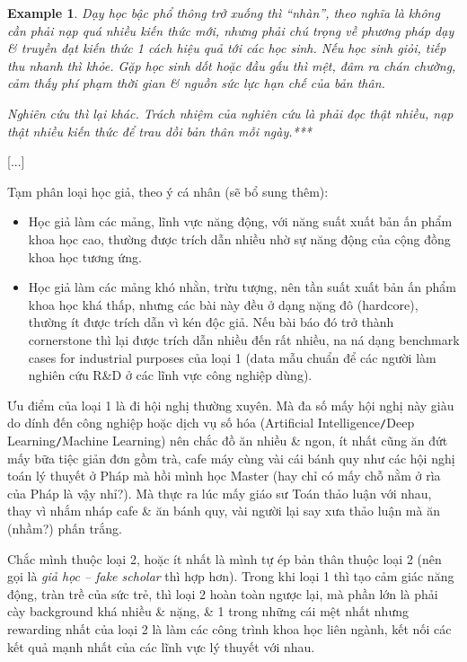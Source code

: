 \documentclass[12pt]{article}
\newtheorem{example}{Example}
\begin{document}
\begin{example}
	Dạy học bậc phổ thông trở xuống thì ``nhàn'', theo nghĩa là không cần phải nạp quá nhiều kiến thức mới, nhưng phải chú trọng về phương pháp dạy \& truyền đạt kiến thức 1 cách hiệu quả tới các học sinh. Nếu học sinh giỏi, tiếp thu nhanh thì khỏe. Gặp học sinh dốt hoặc đầu gấu thì mệt, đâm ra chán chường, cảm thấy phí phạm thời gian \& nguồn sức lực hạn chế của bản thân.
	
	Nghiên cứu thì lại khác. Trách nhiệm của nghiên cứu là phải đọc thật nhiều, nạp thật nhiều kiến thức để trau dồi bản thân mỗi ngày.***
\end{example}
[...]

Tạm phân loại học giả, theo ý cá nhân (sẽ bổ sung thêm):
\begin{itemize}
	\item Học giả làm các mảng, lĩnh vực năng động, với năng suất xuất bản ấn phẩm khoa học cao, thường được trích dẫn nhiều nhờ sự năng động của cộng đồng khoa học tương ứng.
	\item Học giả làm các mảng khó nhằn, trừu tượng, nên tần suất xuất bản ấn phẩm khoa học khá thấp, nhưng các bài này đều ở dạng nặng đô (hardcore), thường ít được trích dẫn vì kén độc giả. Nếu bài báo đó trở thành cornerstone thì lại được trích dẫn nhiều đến rất nhiều, na ná dạng benchmark cases for industrial purposes của loại 1 (data mẫu chuẩn để các người làm nghiên cứu R\&D ở các lĩnh vực công nghiệp dùng).
\end{itemize}
Ưu điểm của loại 1 là đi hội nghị thường xuyên. Mà đa số mấy hội nghị này giàu do dính đến công nghiệp hoặc dịch vụ số hóa (Artificial Intelligence{\tt/}Deep Learning{\tt/}Machine Learning) nên chắc đồ ăn nhiều \& ngon, ít nhất cũng ăn đứt mấy bữa tiệc giản đơn gồm trà, cafe máy cùng vài cái bánh quy như các hội nghị toán lý thuyết ở Pháp mà hồi mình học Master (hay chỉ có mấy chỗ nằm ở rìa của Pháp là vậy nhỉ?). Mà thực ra lúc mấy giáo sư Toán thảo luận với nhau, thay vì nhắm nháp cafe \& ăn bánh quy, vài người lại say xưa thảo luận mà ăn (nhầm?) phấn trắng.

Chắc mình thuộc loại 2, hoặc ít nhất là mình tự ép bản thân thuộc loại 2 (nên gọi là {\it giả học -- fake scholar} thì hợp hơn). Trong khi loại 1 thì tạo cảm giác năng động, tràn trề của sức trẻ, thì loại 2 hoàn toàn ngược lại, mà phần lớn là phải cày background khá nhiều \& nặng, \& 1 trong những cái mệt nhất nhưng rewarding nhất của loại 2 là làm các công trình khoa học liên ngành, kết nối các kết quả mạnh nhất của các lĩnh vực lý thuyết với nhau.
\end{document}

